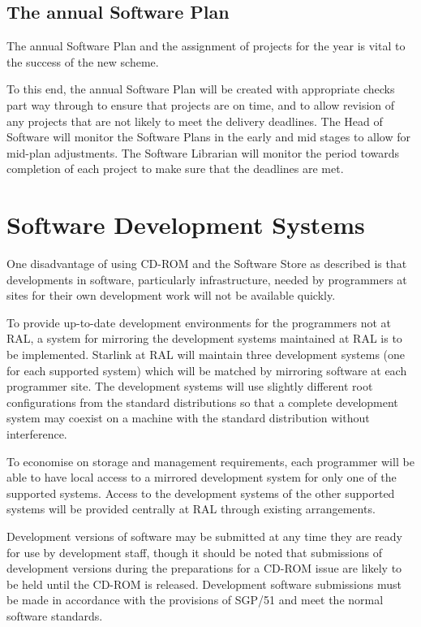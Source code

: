 \documentclass[twoside,11pt]{article}
\newcommand{\xlabel}[1]{}
\begin{document}
\subsection{\label{the_annual_software_plan}\xlabel{the_annual_software_plan}The annual Software Plan}

The annual Software Plan and the assignment of projects for the year is
vital to the success of the new scheme.

To this end, the annual Software Plan will be created with appropriate
checks part way through to ensure that projects are on time, and to
allow revision of any projects that are not likely to meet the delivery
deadlines.  The Head of Software will monitor the Software Plans in the
early and mid stages to allow for mid-plan adjustments.  The Software
Librarian will monitor the period towards completion of each project to
make sure that the deadlines are met.

\section{\label{software_development_systems}\xlabel{software_development_systems}Software Development Systems}

One disadvantage of using CD-ROM and the Software Store as described is
that developments in software, particularly infrastructure, needed by
programmers at sites for their own development work will not be available
quickly.

To provide up-to-date development environments for the programmers not at
RAL, a system for mirroring the development systems maintained at RAL is to
be implemented.  Starlink at RAL will maintain three development systems
(one for each supported system) which will be matched by mirroring
software at each programmer site.   The development systems will use
slightly different root configurations from the standard distributions so
that a complete development system may coexist on a machine with the
standard distribution without interference.

To economise on storage and management requirements, each programmer
will be able to have local access to a mirrored development system for
only one of the supported systems.  Access to the development systems
of the other supported systems will be provided centrally at RAL
through existing arrangements.

Development versions of software may be submitted at any time they are
ready for use by development staff, though it should be noted
that submissions of development versions during the preparations
for a CD-ROM issue are likely to be held until the CD-ROM is released.
Development software submissions must be made in accordance with the
provisions of SGP/51 and meet the normal software standards.
\end{document}
